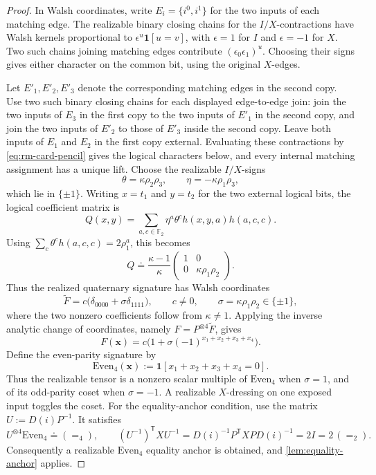 \documentclass[11pt,letterpaper,onecolumn]{article}
\theoremstyle{plain}
\theoremstyle{definition}
\theoremstyle{remark}
\newcommand{\Ftwo}{\mathbb F_2}
\newcommand{\Eq}{=}
\newcommand{\one}{\mathbf 1}
\begin{document}
\begin{proof}
In Walsh coordinates, write \(E_i=\{i^0,i^1\}\) for the two
inputs of each matching edge. The realizable binary closing chains for
the \(I/X\)-contractions have Walsh kernels proportional to
\(\epsilon^u\one[u=v]\), with \(\epsilon=1\) for \(I\) and
\(\epsilon=-1\) for \(X\). Two such chains joining matching edges
contribute \((\epsilon_0\epsilon_1)^u\). Choosing their signs gives
either character on the common bit, using the original \(X\)-edges.

Let \(E'_1,E'_2,E'_3\) denote the corresponding matching edges in the second
copy.  Use two such binary closing chains for each displayed edge-to-edge join:
join the two inputs of \(E_3\) in the first copy to the two inputs of \(E'_1\)
in the second copy, and join the two inputs of \(E'_2\) to those of \(E'_3\)
inside the second copy. Leave both inputs of \(E_1\) and \(E_2\) in the first
copy external.  Evaluating these contractions by
\cref{eq:rm-card-pencil} gives the logical characters below, and every
internal matching assignment has a unique lift.  Choose the realizable
\(I/X\)-signs
\[
  \theta=\kappa \rho_2 \rho_3,
  \qquad
  \eta=-\kappa \rho_1 \rho_3,
\]
which lie in \(\{\pm1\}\).  Writing \(x=t_1\) and \(y=t_2\) for the two
external logical bits, the logical coefficient matrix is
\begin{equation*}
  Q(x,y)=
  \sum_{a,c\in\Ftwo}
  \eta^a\theta^c h(x,y,a)h(a,c,c).
\end{equation*}
Using \(\sum_c\theta^c h(a,c,c)=2\rho_1^a\), this becomes
\begin{equation*}
  Q\doteq
  \frac{\kappa-1}{\kappa}
  \begin{pmatrix}1&0\\0&\kappa \rho_1 \rho_2\end{pmatrix}.
\end{equation*}
Thus the realized quaternary signature has Walsh coordinates
\[
 \widetilde F
 =c\bigl(\delta_{0000}+\sigma\delta_{1111}\bigr),
 \qquad
 c\ne0,
 \qquad \sigma=\kappa \rho_1\rho_2\in\{\pm1\},
\]
where the two nonzero coefficients follow from \(\kappa\ne1\).  Applying
the inverse analytic change of coordinates, namely
\(F=P^{\otimes4}\widetilde F\), gives
\[
 F({\mathbf{x}})=c\bigl(1+\sigma(-1)^{x_1+x_2+x_3+x_4}\bigr).
\]
Define the even-parity signature by
\[
 \mathrm{Even}_4({\mathbf{x}}):=\one[x_1+x_2+x_3+x_4=0].
\]
Thus the realizable tensor is a nonzero scalar multiple of
\(\mathrm{Even}_4\) when \(\sigma=1\), and of its odd-parity coset when
\(\sigma=-1\). A realizable \(X\)-dressing on one exposed input toggles the
coset. For the equality-anchor condition, use the
matrix \(U:=D(i)P^{-1}\). It satisfies
\[
 U^{\otimes4}\mathrm{Even}_4\doteq(\Eq_4),\qquad
 (U^{-1})^{\mathsf T}XU^{-1}
 =D(i)^{-1}P^{\mathsf T}XP D(i)^{-1}=2I=2\,(\Eq_2).
\]
Consequently a realizable \(\mathrm{Even}_4\) equality anchor is obtained, and
\cref{lem:equality-anchor} applies.
\end{proof}
\end{document}
